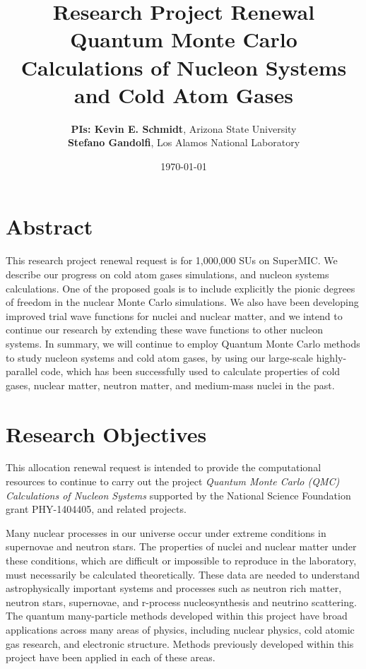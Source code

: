 \documentclass[12pt,letterpaper]{article}
\newcommand{\project}{\large Research Project Renewal  \vskip 0.1cm}
\begin{document}
\onehalfspacing
\title{\project {\Large \textbf{Quantum Monte Carlo Calculations of Nucleon 
Systems and Cold Atom Gases}} \vspace{0cm}}
\author{
{\bf PIs: Kevin E. Schmidt}, Arizona State University \\
{\bf Stefano Gandolfi}, Los Alamos National Laboratory
}
\date{\today}
\maketitle

\section*{Abstract}

This research project renewal request is for 1,000,000 SUs on SuperMIC.
We describe our progress on cold atom gases simulations, and nucleon systems 
calculations.
One of the proposed goals is to include explicitly the pionic degrees of 
freedom in 
the nuclear Monte Carlo simulations.
We also have been developing improved trial wave functions for nuclei and 
nuclear matter, and we intend to continue our research by extending these wave 
functions to other nucleon systems.
In summary, we will continue to employ
Quantum Monte Carlo methods to study nucleon systems and cold atom gases, by 
using  
our large-scale highly-parallel code, which 
has been successfully used to calculate properties of cold gases, nuclear 
matter, 
neutron matter, and medium-mass nuclei in the past.

\section{Research Objectives}

This allocation renewal request is intended to provide the computational 
resources 
to continue to carry out the project \textit{Quantum Monte Carlo (QMC) 
Calculations of 
Nucleon Systems} supported by the National Science Foundation grant 
PHY-1404405, and related projects.

Many nuclear processes in our universe occur under extreme conditions in 
supernovae and neutron stars. The properties of nuclei and nuclear matter 
under these conditions, which are difficult or impossible to reproduce in 
the laboratory, must necessarily be calculated theoretically. These data are 
needed to understand astrophysically important systems and processes such as 
neutron rich matter, neutron stars, supernovae, and r-process 
nucleosynthesis and neutrino scattering. The quantum many-particle methods 
developed within this project have broad applications across many areas of 
physics, including nuclear physics, cold atomic gas research, and electronic 
structure. Methods 
previously developed within this project have been applied in each of these 
areas.
\end{document}

